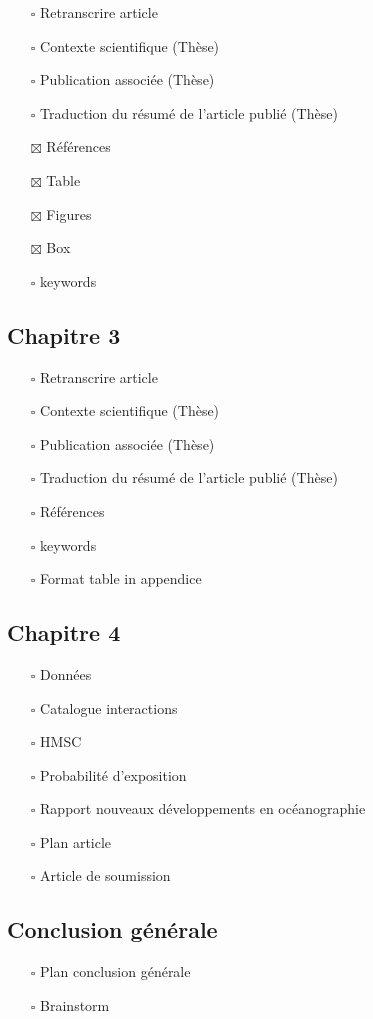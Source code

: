 \begin{itemize}
\tightlist
\item[$\square$]
  Retranscrire article
\item[$\square$]
  Contexte scientifique (Thèse)
\item[$\square$]
  Publication associée (Thèse)
\item[$\square$]
  Traduction du résumé de l'article publié (Thèse)
\item[$\boxtimes$]
  Références
\item[$\boxtimes$]
  Table
\item[$\boxtimes$]
  Figures
\item[$\boxtimes$]
  Box
\item[$\square$]
  keywords
\end{itemize}

\hypertarget{chapitre-3}{%
\subsection{Chapitre 3}\label{chapitre-3}}

\begin{itemize}
\tightlist
\item[$\square$]
  Retranscrire article
\item[$\square$]
  Contexte scientifique (Thèse)
\item[$\square$]
  Publication associée (Thèse)
\item[$\square$]
  Traduction du résumé de l'article publié (Thèse)
\item[$\square$]
  Références
\item[$\square$]
  keywords
\item[$\square$]
  Format table in appendice
\end{itemize}

\hypertarget{chapitre-4}{%
\subsection{Chapitre 4}\label{chapitre-4}}

\begin{itemize}
\tightlist
\item[$\square$]
  Données
\item[$\square$]
  Catalogue interactions
\item[$\square$]
  HMSC
\item[$\square$]
  Probabilité d'exposition
\item[$\square$]
  Rapport nouveaux développements en océanographie
\item[$\square$]
  Plan article
\item[$\square$]
  Article de soumission
\end{itemize}

\hypertarget{conclusion-guxe9nuxe9rale}{%
\subsection{Conclusion générale}\label{conclusion-guxe9nuxe9rale}}

\begin{itemize}
\tightlist
\item[$\square$]
  Plan conclusion générale
\item[$\square$]
  Brainstorm
\end{itemize}
